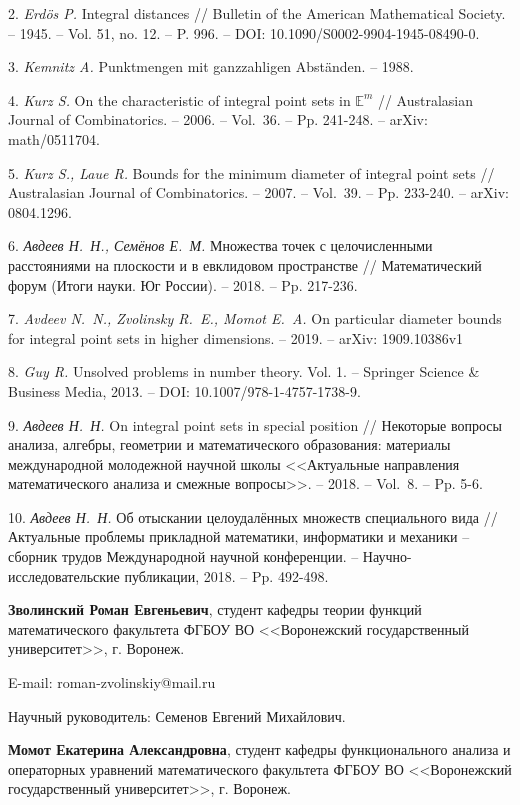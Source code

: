 \documentclass[12pt]{article}
\theoremstyle{theorem}
\theoremstyle{dfn}
\theoremstyle{remark}
\begin{document}
2.	\emph{ Erd{\"o}s P.} Integral distances // Bulletin of the American Mathematical Society. -- 1945. -- Vol. 51, no. 12. -- P. 996. -- DOI: 10.1090/S0002-9904-1945-08490-0.

3.  \emph{ Kemnitz A.} Punktmengen mit ganzzahligen Abst{\"a}nden. -- 1988.

4.  \emph{ Kurz S.} On the characteristic of integral point sets in $\mathbb{E}^m$ // Australasian Journal of Combinatorics. -- 2006. -- Vol.~36. -- Pp. 241-248. --
arXiv: math/0511704.

5.  \emph{ Kurz S., Laue R.} Bounds for the minimum diameter of integral point sets
// Australasian Journal of Combinatorics. -- 2007. -- Vol.~39. -- Pp. 233-240. --
arXiv: 0804.1296.

6.  \emph{ Авдеев Н.~Н., Семёнов Е.~М.} Множества точек с целочисленными расстояниями на плоскости и в евклидовом пространстве // Математический форум
(Итоги науки. Юг России). -- 2018. -- Pp. 217-236.

7.  \emph{ Avdeev N.~N., Zvolinsky R.~E., Momot E.~A.} On particular diameter bounds
for integral point sets in higher dimensions. -- 2019. -- arXiv: 1909.10386v1

8.  \emph{ Guy R.} Unsolved problems in number theory. Vol. 1. -- Springer Science \& Business Media, 2013. -- DOI: 10.1007/978-1-4757-1738-9.

9.  \emph{ Авдеев Н.~Н.} On integral point sets in special position // Некоторые вопросы анализа, алгебры, геометрии и математического образования: материалы международной молодежной научной школы <<Актуальные направления математического анализа и смежные вопросы>>. -- 2018. -- Vol.~8. -- Pp. 5-6.

10.  \emph{ Авдеев Н.~Н.} Об отыскании целоудалённых множеств специального вида
// Актуальные проблемы прикладной математики, информатики и механики --
сборник трудов Международной научной конференции. -- Научно-исследовательские публикации, 2018. -- Pp. 492-498.


{\bf Зволинский Роман Евгеньевич},
студент кафедры теории функций математического факультета ФГБОУ ВО <<Воронежский государственный университет>>, г. Воронеж.

E-mail: roman-zvolinskiy@mail.ru

Научный руководитель: Семенов Евгений Михайлович.

{\bf Момот Екатерина Александровна},
студент кафедры функционального анализа и операторных уравнений математического факультета
ФГБОУ ВО <<Воронежский государственный университет>>, г. Воронеж.
\end{document}
